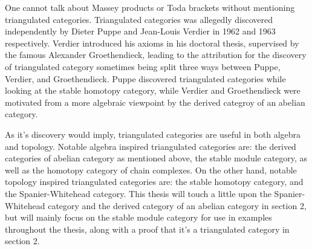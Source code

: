One cannot talk about Massey products or Toda brackets without mentioning triangulated categories. Triangulated categories was allegedly discovered independently by Dieter Puppe and Jean-Louis Verdier in 1962 and 1963 respectively. Verdier introduced his axioms in his doctoral thesis, supervised by the famous Alexander Groethendieck, leading to the attribution for the discovery of triangulated category sometimes being split three ways between Puppe, Verdier, and Groethendieck. Puppe discovered triangulated categories while looking at the stable homotopy category, while Verdier and Groethendieck were motivated from a more algebraic viewpoint by the derived categroy of an abelian category.

As it's discovery would imply, triangulated categories are useful in both algebra and topology. Notable algebra inspired triangulated categories are: the derived categories of abelian category as mentioned above, the stable module category, as well as the homotopy category of chain complexes. On the other hand, notable topology inspired triangulated categories are: the stable homotopy category, and the Spanier-Whitehead category. This thesis will touch a little upon the Spanier-Whitehead category and the derived category of an abelian category in section 2, but will mainly focus on the stable module category for use in examples throughout the thesis, along with a proof that it's a triangulated category in section 2.


